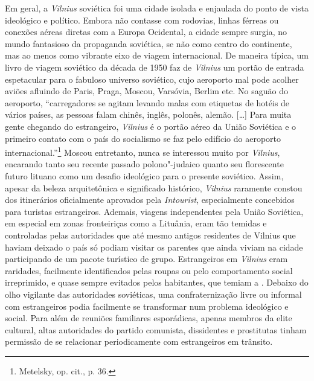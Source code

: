 Em geral, a \textit{Vilnius} soviética foi uma cidade isolada e enjaulada do
ponto de vista ideológico e político. Embora não contasse com rodovias,
linhas férreas ou conexões aéreas diretas com a Europa Ocidental, a
cidade sempre surgia, no mundo fantasioso da propaganda soviética, se
não como centro do continente, mas ao menos como vibrante eixo de viagem
internacional. De maneira típica, um livro de viagem soviético da década
de 1950 faz de \textit{Vilnius} um portão de entrada espetacular para o fabuloso
universo soviético, cujo aeroporto mal pode acolher aviões afluindo de
Paris, Praga, Moscou, Varsóvia, Berlim etc. No saguão do aeroporto,
``carregadores se agitam levando malas com etiquetas de hotéis de vários
países, as pessoas falam chinês, inglês, polonês, alemão. [\ldots{}] Para
muita gente chegando do estrangeiro, \textit{Vilnius} é o portão aéreo da União
Soviética e o primeiro contato com o país do socialismo se faz pelo
edifício do aeroporto internacional.''\footnote{Metelsky, op. cit., p. 36.} Moscou entretanto, nunca se interessou muito por \textit{Vilnius}, encarando tanto seu recente passado polono"-judaico quanto seu
florescente futuro lituano como um desafio ideológico para o presente
soviético. Assim, apesar da beleza arquitetônica e significado
histórico, \textit{Vilnius} raramente constou dos itinerários oficialmente
aprovados pela \textit{Intourist}, especialmente concebidos para turistas
estrangeiros. Ademais, viagens independentes pela União Soviética, em
especial em zonas fronteiriças como a Lituânia, eram tão temidas e
controladas pelas autoridades que até mesmo antigos residentes de
Vilnius que haviam deixado o país só podiam visitar os parentes que
ainda viviam na cidade participando de um pacote turístico de grupo.
Estrangeiros em \textit{Vilnius} eram raridades, facilmente identificados pelas
roupas ou pelo comportamento social irreprimido, e quase sempre evitados
pelos habitantes, que temiam a . Debaixo do olho vigilante das
autoridades soviéticas, uma confraternização livre ou informal com
estrangeiros podia facilmente se transformar num problema ideológico e
social. Para além de reuniões familiares esporádicas, apenas membros da
elite cultural, altas autoridades do partido comunista, dissidentes e
prostitutas tinham permissão de se relacionar periodicamente com
estrangeiros em trânsito.

